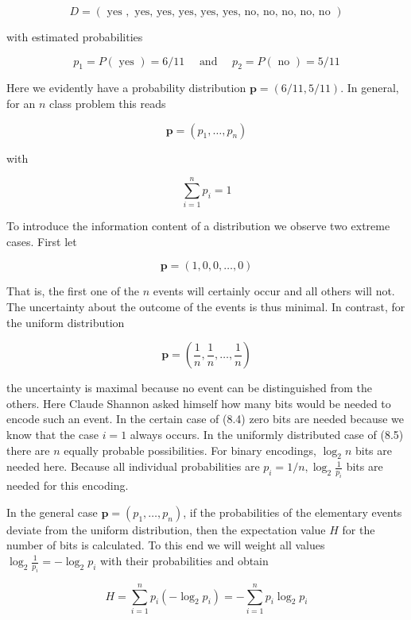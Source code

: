 \documentclass[10pt]{article}
\begin{document}
$$
D=(\text { yes }, \text { yes, yes, yes, yes, yes, no, no, no, no, no })
$$

with estimated probabilities

$$
p_{1}=P(\text { yes })=6 / 11 \quad \text { and } \quad p_{2}=P(\text { no })=5 / 11
$$

Here we evidently have a probability distribution $\boldsymbol{p}=(6 / 11,5 / 11)$. In general, for an $n$ class problem this reads

$$
\boldsymbol{p}=\left(p_{1}, \ldots, p_{n}\right)
$$

with

$$
\sum_{i=1}^{n} p_{i}=1
$$

To introduce the information content of a distribution we observe two extreme cases. First let


\begin{equation*}
\boldsymbol{p}=(1,0,0, \ldots, 0) \tag{8.4}
\end{equation*}


That is, the first one of the $n$ events will certainly occur and all others will not. The uncertainty about the outcome of the events is thus minimal. In contrast, for the uniform distribution


\begin{equation*}
\boldsymbol{p}=\left(\frac{1}{n}, \frac{1}{n}, \ldots, \frac{1}{n}\right) \tag{8.5}
\end{equation*}


the uncertainty is maximal because no event can be distinguished from the others. Here Claude Shannon asked himself how many bits would be needed to encode such an event. In the certain case of (8.4) zero bits are needed because we know that the case $i=1$ always occurs. In the uniformly distributed case of (8.5) there are $n$ equally probable possibilities. For binary encodings, $\log _{2} n$ bits are needed here. Because all individual probabilities are $p_{i}=1 / n, \log _{2} \frac{1}{p_{i}}$ bits are needed for this encoding.

In the general case $\boldsymbol{p}=\left(p_{1}, \ldots, p_{n}\right)$, if the probabilities of the elementary events deviate from the uniform distribution, then the expectation value $H$ for the number of bits is calculated. To this end we will weight all values $\log _{2} \frac{1}{p_{i}}=-\log _{2} p_{i}$ with their probabilities and obtain

$$
H=\sum_{i=1}^{n} p_{i}\left(-\log _{2} p_{i}\right)=-\sum_{i=1}^{n} p_{i} \log _{2} p_{i}
$$
\end{document}
